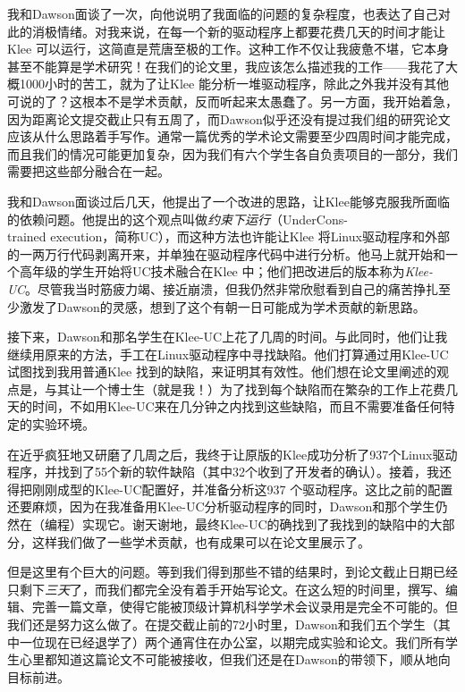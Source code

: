 \documentclass[12pt,UTF8,nofonts]{book}
\begin{document}
我和Dawson面谈了一次，向他说明了我面临的问题的复杂程度，也表达了自己对此的消极情绪。对我来说，在每一个新的驱动程序上都要花费几天的时间才能让Klee 可以运行，这简直是荒唐至极的工作。这种工作不仅让我疲惫不堪，它本身甚至不能算是学术研究！在我们的论文里，我应该怎么描述我的工作——我花了大概1000小时的苦工，就为了让Klee 能分析一堆驱动程序，除此之外我并没有其他可说的了？这根本不是学术贡献，反而听起来太愚蠢了。另一方面，我开始着急，因为距离论文提交截止只有五周了，而Dawson似乎还没有提过我们组的研究论文应该从什么思路着手写作。通常一篇优秀的学术论文需要至少四周时间才能完成，而且我们的情况可能更加复杂，因为我们有六个学生各自负责项目的一部分，我们需要把这些部分融合在一起。

我和Dawson面谈过后几天，他提出了一个改进的思路，让Klee能够克服我所面临的依赖问题。他提出的这个观点叫做\emph{约束下运行}（UnderCons-\\trained execution，简称UC），而这种方法也许能让Klee 将Linux驱动程序和外部的一两万行代码剥离开来，并单独在驱动程序代码中进行分析。他马上就开始和一个高年级的学生开始将UC技术融合在Klee 中；他们把改进后的版本称为\emph{Klee-UC}。尽管我当时筋疲力竭、接近崩溃，但我仍然非常欣慰看到自己的痛苦挣扎至少激发了Dawson的灵感，想到了这个有朝一日可能成为学术贡献的新思路。

接下来，Dawson和那名学生在Klee-UC上花了几周的时间。与此同时，他们让我继续用原来的方法，手工在Linux驱动程序中寻找缺陷。他们打算通过用Klee-UC试图找到我用普通Klee 找到的缺陷，来证明其有效性。他们想在论文里阐述的观点是，与其让一个博士生（就是我！）为了找到每个缺陷而在繁杂的工作上花费几天的时间，不如用Klee-UC来在几分钟之内找到这些缺陷，而且不需要准备任何特定的实验环境。

在近乎疯狂地又研磨了几周之后，我终于让原版的Klee成功分析了937个Linux驱动程序，并找到了55个新的软件缺陷（其中32个收到了开发者的确认）。接着，我还得把刚刚成型的Klee-UC配置好，并准备分析这937 个驱动程序。这比之前的配置还要麻烦，因为在我准备用Klee-UC分析驱动程序的同时，Dawson和那个学生仍然在（编程）实现它。谢天谢地，最终Klee-UC的确找到了我找到的缺陷中的大部分，这样我们做了一些学术贡献，也有成果可以在论文里展示了。

但是这里有个巨大的问题。等到我们得到那些不错的结果时，到论文截止日期已经只剩下\emph{三天}了，而我们都完全没有着手开始写论文。在这么短的时间里，撰写、编辑、完善一篇文章，使得它能被顶级计算机科学学术会议录用是完全不可能的。但我们还是努力这么做了。在提交截止前的72小时里，Dawson和我们五个学生（其中一位现在已经退学了）两个通宵住在办公室，以期完成实验和论文。我们所有学生心里都知道这篇论文不可能被接收，但我们还是在Dawson的带领下，顺从地向目标前进。
\end{document}
